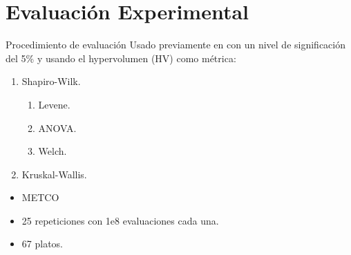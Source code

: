 \documentclass[12pt]{beamer}
\begin{document}
\section{Evaluación Experimental}
\begin{frame}[fragile]{Procedimiento de evaluación}
Usado previamente en \cite{7347400} con un nivel de significación del 5\% y usando el hypervolumen (HV) como métrica:
    \begin{enumerate}
        \item Shapiro-Wilk.
            \begin{enumerate}
                \item Levene.
                \item ANOVA.
                \item Welch.
            \end{enumerate}
        \item Kruskal-Wallis.
    \end{enumerate}
\begin{itemize}
        \item METCO
        \item 25 repeticiones con 1e8 evaluaciones cada una.
        \item 67 platos.
    \end{itemize}
\end{frame}
\end{document}
